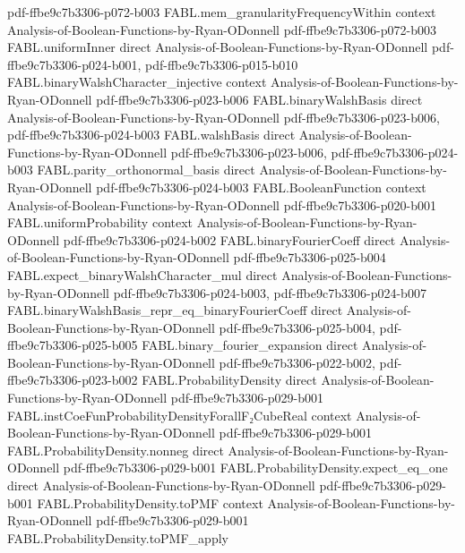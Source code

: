 \begin{theorem}
  {pdf-ffbe9c7b3306-p072-b003}
\proofstep
  {FABL.mem_granularityFrequencyWithin}
  {context}
  {Analysis-of-Boolean-Functions-by-Ryan-ODonnell}
  {pdf-ffbe9c7b3306-p072-b003}
\proofstep
  {FABL.uniformInner}
  {direct}
  {Analysis-of-Boolean-Functions-by-Ryan-ODonnell}
  {pdf-ffbe9c7b3306-p024-b001,
    pdf-ffbe9c7b3306-p015-b010}
\proofstep
  {FABL.binaryWalshCharacter_injective}
  {context}
  {Analysis-of-Boolean-Functions-by-Ryan-ODonnell}
  {pdf-ffbe9c7b3306-p023-b006}
\proofstep
  {FABL.binaryWalshBasis}
  {direct}
  {Analysis-of-Boolean-Functions-by-Ryan-ODonnell}
  {pdf-ffbe9c7b3306-p023-b006,
    pdf-ffbe9c7b3306-p024-b003}
\proofstep
  {FABL.walshBasis}
  {direct}
  {Analysis-of-Boolean-Functions-by-Ryan-ODonnell}
  {pdf-ffbe9c7b3306-p023-b006,
    pdf-ffbe9c7b3306-p024-b003}
\proofstep
  {FABL.parity_orthonormal_basis}
  {direct}
  {Analysis-of-Boolean-Functions-by-Ryan-ODonnell}
  {pdf-ffbe9c7b3306-p024-b003}
\proofstep
  {FABL.BooleanFunction}
  {context}
  {Analysis-of-Boolean-Functions-by-Ryan-ODonnell}
  {pdf-ffbe9c7b3306-p020-b001}
\proofstep
  {FABL.uniformProbability}
  {context}
  {Analysis-of-Boolean-Functions-by-Ryan-ODonnell}
  {pdf-ffbe9c7b3306-p024-b002}
\proofstep
  {FABL.binaryFourierCoeff}
  {direct}
  {Analysis-of-Boolean-Functions-by-Ryan-ODonnell}
  {pdf-ffbe9c7b3306-p025-b004}
\proofstep
  {FABL.expect_binaryWalshCharacter_mul}
  {direct}
  {Analysis-of-Boolean-Functions-by-Ryan-ODonnell}
  {pdf-ffbe9c7b3306-p024-b003,
    pdf-ffbe9c7b3306-p024-b007}
\proofstep
  {FABL.binaryWalshBasis_repr_eq_binaryFourierCoeff}
  {direct}
  {Analysis-of-Boolean-Functions-by-Ryan-ODonnell}
  {pdf-ffbe9c7b3306-p025-b004,
    pdf-ffbe9c7b3306-p025-b005}
\proofstep
  {FABL.binary_fourier_expansion}
  {direct}
  {Analysis-of-Boolean-Functions-by-Ryan-ODonnell}
  {pdf-ffbe9c7b3306-p022-b002,
    pdf-ffbe9c7b3306-p023-b002}
\proofstep
  {FABL.ProbabilityDensity}
  {direct}
  {Analysis-of-Boolean-Functions-by-Ryan-ODonnell}
  {pdf-ffbe9c7b3306-p029-b001}
\proofstep
  {FABL.instCoeFunProbabilityDensityForallF₂CubeReal}
  {context}
  {Analysis-of-Boolean-Functions-by-Ryan-ODonnell}
  {pdf-ffbe9c7b3306-p029-b001}
\proofstep
  {FABL.ProbabilityDensity.nonneg}
  {direct}
  {Analysis-of-Boolean-Functions-by-Ryan-ODonnell}
  {pdf-ffbe9c7b3306-p029-b001}
\proofstep
  {FABL.ProbabilityDensity.expect_eq_one}
  {direct}
  {Analysis-of-Boolean-Functions-by-Ryan-ODonnell}
  {pdf-ffbe9c7b3306-p029-b001}
\proofstep
  {FABL.ProbabilityDensity.toPMF}
  {context}
  {Analysis-of-Boolean-Functions-by-Ryan-ODonnell}
  {pdf-ffbe9c7b3306-p029-b001}
\proofstep
  {FABL.ProbabilityDensity.toPMF_apply}

\end{theorem}
